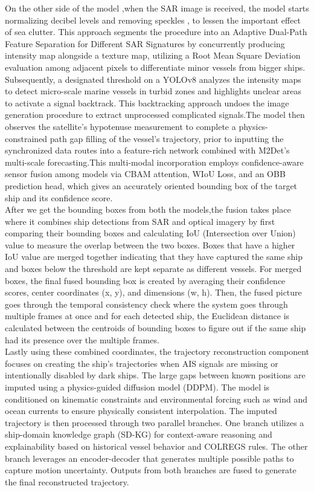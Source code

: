 On the other side of the model ,when the SAR image is received, the model starts  normalizing decibel levels and removing speckles , to lessen the important effect of sea clutter. This approach segments the procedure into an Adaptive Dual-Path Feature Separation for Different SAR Signatures by concurrently producing  intensity map alongside a texture map, utilizing a Root Mean Square Deviation evaluation among adjacent pixels to differentiate minor vessels from bigger ships. Subsequently, a designated threshold on a YOLOv8 analyzes the intensity maps to detect micro-scale marine vessels in turbid zones and highlights unclear areas to activate a signal backtrack. This backtracking approach undoes the image generation procedure to extract unprocessed complicated signals.The model then observes the satellite's hypotenuse measurement to complete a physics-constrained path gap filling of the vessel's trajectory, prior to inputting the synchronized data routes into a feature-rich network combined with M2Det's multi-scale forecasting.This multi-modal incorporation employs confidence-aware sensor fusion among models via CBAM attention, WIoU Loss, and an OBB prediction head, which gives an accurately oriented bounding box of the target ship and its confidence score.\\

After we get the bounding boxes from both the models,the fusion takes place where it combines ship detections from SAR and optical imagery by first comparing their bounding boxes and calculating IoU (Intersection over Union) value  to measure the overlap between the two boxes. Boxes that have a higher IoU value are merged together indicating that they have captured the same ship and boxes below the threshold are kept separate as different vessels. For merged boxes, the final fused bounding box is created by averaging their confidence scores, center coordinates (x, y), and dimensions (w, h). Then, the fused picture  goes through the temporal consistency check where the system goes through multiple frames at once and for each detected ship, the Euclidean distance is calculated between the centroids of bounding boxes to figure out if the same ship had its presence over the multiple frames.\\

Lastly using these combined coordinates, the trajectory reconstruction component focuses on creating the ship’s trajectories when AIS signals are missing or intentionally disabled by dark ships. The large gaps between known positions are imputed using a physics-guided diffusion model (DDPM). The model is conditioned on kinematic constraints and environmental forcing such as wind and ocean currents to ensure physically consistent interpolation. The imputed trajectory is then processed through two parallel branches. One branch utilizes a ship-domain knowledge graph (SD-KG) for context-aware reasoning and explainability based on historical vessel behavior and COLREGS rules. The other branch leverages an encoder-decoder that generates multiple possible paths to capture motion uncertainty. Outputs from both branches are fused to generate the final reconstructed trajectory. 
 \\





